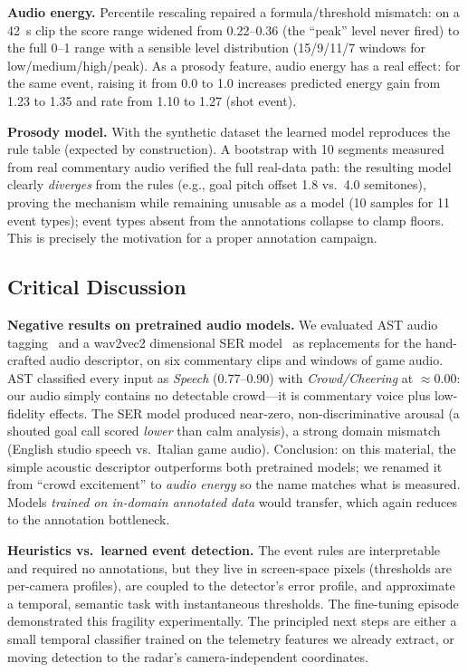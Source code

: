 \documentclass[10pt,twocolumn,a4paper]{article}
\begin{document}
	\textbf{Audio energy.} Percentile rescaling repaired a formula/threshold mismatch: on a 42~s clip the score range widened from 0.22--0.36 (the ``peak'' level never fired) to the full 0--1 range with a sensible level distribution (15/9/11/7 windows for low/medium/high/peak). As a prosody feature, audio energy has a real effect: for the same event, raising it from 0.0 to 1.0 increases predicted energy gain from 1.23 to 1.35 and rate from 1.10 to 1.27 (shot event).

	\textbf{Prosody model.} With the synthetic dataset the learned model reproduces the rule table (expected by construction). A bootstrap with 10 segments measured from real commentary audio verified the full real-data path: the resulting model clearly \emph{diverges} from the rules (e.g., goal pitch offset 1.8 vs.\ 4.0 semitones), proving the mechanism while remaining unusable as a model (10 samples for 11 event types); event types absent from the annotations collapse to clamp floors. This is precisely the motivation for a proper annotation campaign.

	\subsection{Critical Discussion}

	\textbf{Negative results on pretrained audio models.} We evaluated AST audio tagging~\cite{gong2021ast} and a wav2vec2 dimensional SER model~\cite{wagner2023dawn} as replacements for the hand-crafted audio descriptor, on six commentary clips and windows of game audio. AST classified every input as \emph{Speech} (0.77--0.90) with \emph{Crowd/Cheering} at $\approx$0.00: our audio simply contains no detectable crowd---it is commentary voice plus low-fidelity effects. The SER model produced near-zero, non-discriminative arousal (a shouted goal call scored \emph{lower} than calm analysis), a strong domain mismatch (English studio speech vs.\ Italian game audio). Conclusion: on this material, the simple acoustic descriptor outperforms both pretrained models; we renamed it from ``crowd excitement'' to \emph{audio energy} so the name matches what is measured. Models \emph{trained on in-domain annotated data} would transfer, which again reduces to the annotation bottleneck.

	\textbf{Heuristics vs.\ learned event detection.} The event rules are interpretable and required no annotations, but they live in screen-space pixels (thresholds are per-camera profiles), are coupled to the detector's error profile, and approximate a temporal, semantic task with instantaneous thresholds. The fine-tuning episode demonstrated this fragility experimentally. The principled next steps are either a small temporal classifier trained on the telemetry features we already extract, or moving detection to the radar's camera-independent coordinates.
\end{document}
